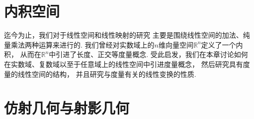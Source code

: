 \chapter{内积空间}
迄今为止，我们对于线性空间和线性映射的研究
主要是围绕线性空间的加法、纯量乘法两种运算来进行的.
我们曾经对实数域上的\(n\)维向量空间\(\mathbb{R}^n\)定义了一个内积，
从而在\(\mathbb{R}^n\)中引进了长度、正交等度量概念.
受此启发，我们在本章讨论如何在实数域、复数域以至于任意域上的线性空间中引进度量概念，
然后研究具有度量的线性空间的结构，
并且研究与度量有关的线性变换的性质.









\chapter{仿射几何与射影几何}

